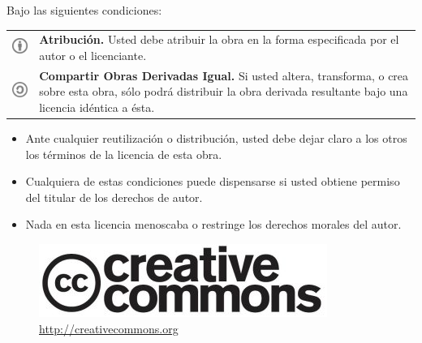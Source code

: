 \noindent Bajo las siguientes condiciones:\newline
\begin{tabular}[t]{rl}
\multirow{5}{*}{\includegraphics{licencia/by.jpg}} &
\multirow{5}{*}{\parbox{300pt}{\textbf{Atribución.} Usted debe atribuir la
obra en la forma especificada por el autor o el licenciante.}} \\ \\ \\ \\ \\
\multirow{5}{*}{\includegraphics{licencia/sa.jpg}} &
\multirow{5}{*}{\parbox{300pt}{\textbf{Compartir Obras Derivadas Igual.} Si
usted altera, transforma, o crea sobre esta obra, sólo podrá distribuir la
obra derivada resultante bajo una licencia idéntica a ésta.}} \\ \\ \\ \\
\end{tabular}\newline\newline

\begin{itemize}
\item Ante cualquier reutilización o distribución, usted debe dejar claro a
los otros los términos de la licencia de esta obra.
\item Cualquiera de estas condiciones puede dispensarse si usted obtiene
permiso del titular de los derechos de autor.
\item Nada en esta licencia menoscaba o restringe los derechos morales del
autor.
\end{itemize}

\begin{figure}[b]
\begin{center}
\includegraphics*[scale=0.5]{licencia/cc-logo.jpg}
\linebreak\href{http://creativecommons.org}{http://creativecommons.org}
\end{center}
\end{figure}

